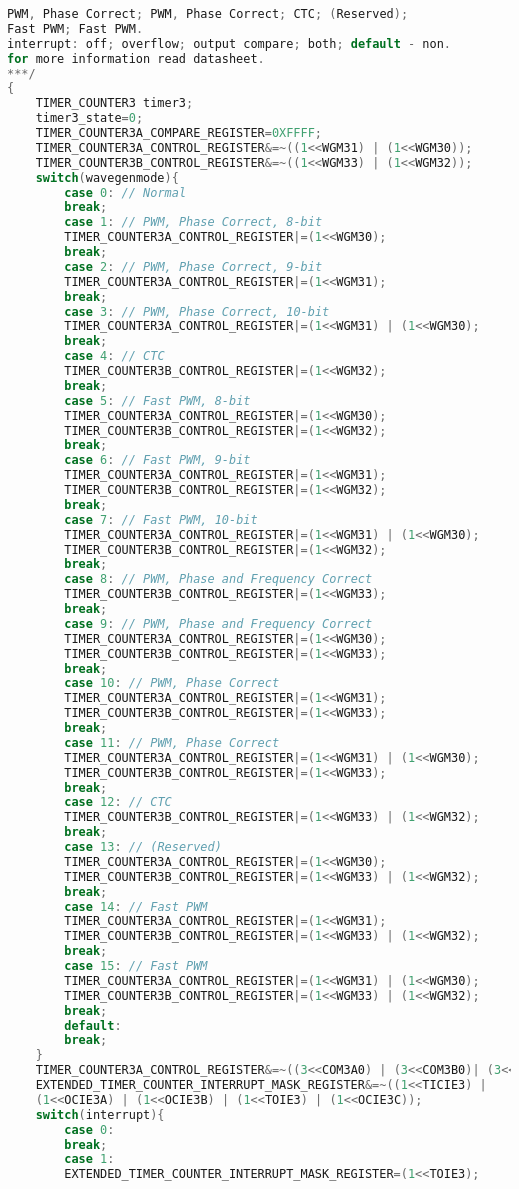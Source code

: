 \begin{lstlisting}[language=C]
PWM, Phase Correct; PWM, Phase Correct; CTC; (Reserved);
Fast PWM; Fast PWM.
interrupt: off; overflow; output compare; both; default - non.
for more information read datasheet.
***/
{
	TIMER_COUNTER3 timer3;
	timer3_state=0;
	TIMER_COUNTER3A_COMPARE_REGISTER=0XFFFF;
	TIMER_COUNTER3A_CONTROL_REGISTER&=~((1<<WGM31) | (1<<WGM30));
	TIMER_COUNTER3B_CONTROL_REGISTER&=~((1<<WGM33) | (1<<WGM32));
	switch(wavegenmode){
		case 0: // Normal
		break;
		case 1: // PWM, Phase Correct, 8-bit
		TIMER_COUNTER3A_CONTROL_REGISTER|=(1<<WGM30);
		break;
		case 2:	// PWM, Phase Correct, 9-bit
		TIMER_COUNTER3A_CONTROL_REGISTER|=(1<<WGM31);
		break;
		case 3:	// PWM, Phase Correct, 10-bit
		TIMER_COUNTER3A_CONTROL_REGISTER|=(1<<WGM31) | (1<<WGM30);
		break;
		case 4:	// CTC
		TIMER_COUNTER3B_CONTROL_REGISTER|=(1<<WGM32);
		break;
		case 5:	// Fast PWM, 8-bit
		TIMER_COUNTER3A_CONTROL_REGISTER|=(1<<WGM30);
		TIMER_COUNTER3B_CONTROL_REGISTER|=(1<<WGM32);
		break;
		case 6:	// Fast PWM, 9-bit
		TIMER_COUNTER3A_CONTROL_REGISTER|=(1<<WGM31);
		TIMER_COUNTER3B_CONTROL_REGISTER|=(1<<WGM32);
		break;
		case 7:	// Fast PWM, 10-bit
		TIMER_COUNTER3A_CONTROL_REGISTER|=(1<<WGM31) | (1<<WGM30);
		TIMER_COUNTER3B_CONTROL_REGISTER|=(1<<WGM32);
		break;
		case 8:	// PWM, Phase and Frequency Correct
		TIMER_COUNTER3B_CONTROL_REGISTER|=(1<<WGM33);
		break;
		case 9:	// PWM, Phase and Frequency Correct
		TIMER_COUNTER3A_CONTROL_REGISTER|=(1<<WGM30);
		TIMER_COUNTER3B_CONTROL_REGISTER|=(1<<WGM33);
		break;
		case 10: // PWM, Phase Correct
		TIMER_COUNTER3A_CONTROL_REGISTER|=(1<<WGM31);
		TIMER_COUNTER3B_CONTROL_REGISTER|=(1<<WGM33);
		break;
		case 11: // PWM, Phase Correct
		TIMER_COUNTER3A_CONTROL_REGISTER|=(1<<WGM31) | (1<<WGM30);
		TIMER_COUNTER3B_CONTROL_REGISTER|=(1<<WGM33);
		break;
		case 12: // CTC
		TIMER_COUNTER3B_CONTROL_REGISTER|=(1<<WGM33) | (1<<WGM32);
		break;
		case 13: // (Reserved)
		TIMER_COUNTER3A_CONTROL_REGISTER|=(1<<WGM30);
		TIMER_COUNTER3B_CONTROL_REGISTER|=(1<<WGM33) | (1<<WGM32);
		break;
		case 14: // Fast PWM
		TIMER_COUNTER3A_CONTROL_REGISTER|=(1<<WGM31);
		TIMER_COUNTER3B_CONTROL_REGISTER|=(1<<WGM33) | (1<<WGM32);
		break;
		case 15: // Fast PWM
		TIMER_COUNTER3A_CONTROL_REGISTER|=(1<<WGM31) | (1<<WGM30);
		TIMER_COUNTER3B_CONTROL_REGISTER|=(1<<WGM33) | (1<<WGM32);
		break;
		default:
		break;
	}
	TIMER_COUNTER3A_CONTROL_REGISTER&=~((3<<COM3A0) | (3<<COM3B0)| (3<<COM3C0));
	EXTENDED_TIMER_COUNTER_INTERRUPT_MASK_REGISTER&=~((1<<TICIE3) |
	(1<<OCIE3A) | (1<<OCIE3B) | (1<<TOIE3) | (1<<OCIE3C));
	switch(interrupt){
		case 0:
		break;
		case 1:
		EXTENDED_TIMER_COUNTER_INTERRUPT_MASK_REGISTER=(1<<TOIE3);

\end{lstlisting}
